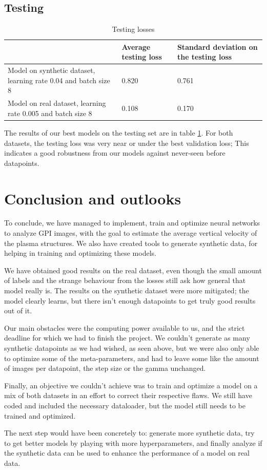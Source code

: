 \documentclass[10pt,conference]{IEEEtran}
\begin{document}
\subsection{Testing}

\begin{table}[h]
    \begin{tabular}{ | m{} | m{}| m{} | }
         \hline
            & Average testing loss &  Standard deviation on the testing loss\\  
         \hline\hline
         Model on synthetic dataset, learning rate 0.04 and batch size 8  & 0.820& 0.761\\ 
         \hline
         Model on real dataset, learning rate 0.005 and batch size 8   & 0.108& 0.170\\
         \hline
    \end{tabular}
    \caption{Testing losses}
    \label{table:testing}
\end{table}
The results of our best models on the testing set are in table \ref{table:testing}. For both datasets, the testing loss was very near or under the best validation loss; This indicates a good robustness from our models against never-seen before datapoints. 

\section{Conclusion and outlooks}
To conclude, we have managed to implement, train and optimize neural networks to analyze GPI images, with the goal to estimate the average vertical velocity of the plasma structures. We also have created tools to generate synthetic data, for helping in training and optimizing these models.\par
We have obtained good results on the real dataset, even though the small amount of labels and the strange behaviour from the losses still ask how general that model really is. The results on the synthetic dataset were more mitigated; the model clearly learns, but there isn't enough datapoints to get truly good results out of it.\par
Our main obstacles were the computing power available to us, and the strict deadline for which we had to finish the project. We couldn't generate as many synthetic datapoints as we had wished, as seen above, but we were also only able to optimize some of the meta-parameters, and had to leave some like the amount of images per datapoint, the step size or the gamma unchanged.\par
Finally, an objective we couldn't achieve was to train and optimize a model on a mix of both datasets in an effort to correct their respective flaws. We still have coded and included the necessary dataloader, but the model still needs to be trained and optimized.\par
The next step would have been concretely to: generate more synthetic data, try to get better models by playing with more hyperparameters, and finally analyze if the synthetic data can be used to enhance the performance of a model on real data.




\end{document}
